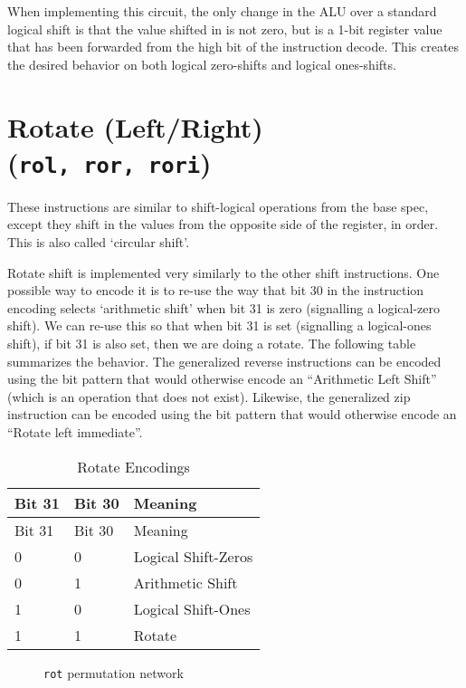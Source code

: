 When implementing this circuit, the only change in the ALU over a
standard logical shift is that the value shifted in is not zero, but is
a 1-bit register value that has been forwarded from the high bit of the
instruction decode. This creates the desired behavior on both logical
zero-shifts and logical ones-shifts.


\section{Rotate (Left/Right) (\texttt{rol,\ ror,\ rori})}

These instructions are similar to shift-logical operations from the base
spec, except they shift in the values from the opposite side of the
register, in order. This is also called `circular shift'.





Rotate shift is implemented very similarly to the other shift
instructions. One possible way to encode it is to re-use the way that
bit 30 in the instruction encoding selects `arithmetic shift' when bit
31 is zero (signalling a logical-zero shift). We can re-use this so that
when bit 31 is set (signalling a logical-ones shift), if bit 31 is also
set, then we are doing a rotate. The following table summarizes the
behavior. The generalized reverse instructions can be encoded using the
bit pattern that would otherwise encode an ``Arithmetic Left Shift''
(which is an operation that does not exist). Likewise, the generalized zip
instruction can be encoded using the bit pattern that would otherwise
encode an ``Rotate left immediate''.

\begin{longtable}[c]{@{}lll@{}}
\caption{Rotate Encodings}\tabularnewline
\toprule
Bit 31 & Bit 30 & Meaning\tabularnewline
\midrule
\endfirsthead
\toprule
Bit 31 & Bit 30 & Meaning\tabularnewline
\midrule
\endhead
0 & 0 & Logical Shift-Zeros\tabularnewline
0 & 1 & Arithmetic Shift\tabularnewline
1 & 0 & Logical Shift-Ones\tabularnewline
1 & 1 & Rotate\tabularnewline
\bottomrule
\end{longtable}


\begin{figure}[t]
\begin{center}

\end{center}
\caption{\texttt{rot} permutation network}
\label{permnet-rot}
\end{figure}

